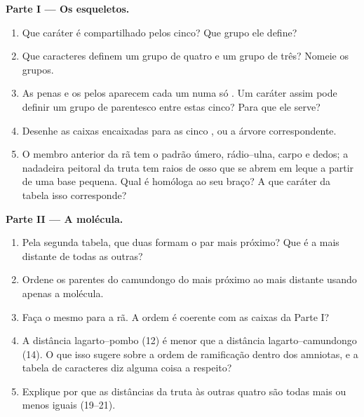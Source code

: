 \begin{problem}
\medskip
\noindent\textbf{Parte I --- Os esqueletos.}
\begin{enumerate}
  \item Que caráter é compartilhado pelos cinco? Que grupo ele define?
  \item Que caracteres definem um grupo de quatro e um grupo de três?
        Nomeie os grupos.
  \item As penas e os pelos aparecem cada um numa só . Um
        caráter assim pode definir um grupo de parentesco entre estas
        cinco? Para que ele serve?
  \item Desenhe as caixas encaixadas para as cinco , ou a
        árvore correspondente.
  \item O membro anterior da rã tem o padrão úmero, rádio--ulna, carpo
        e dedos; a nadadeira peitoral da truta tem raios de osso que se
        abrem em leque a partir de uma base pequena. Qual é homóloga ao
        seu braço? A que caráter da tabela isso corresponde?
\end{enumerate}

\medskip
\noindent\textbf{Parte II --- A molécula.}
\begin{enumerate}[resume]
  \item Pela segunda tabela, que duas  formam o par mais
        próximo? Que  é a mais distante de todas as outras?
  \item Ordene os parentes do camundongo do mais próximo ao mais
        distante usando apenas a molécula.
  \item Faça o mesmo para a rã. A ordem é coerente com as caixas da
        Parte I?
  \item A distância lagarto--pombo (12) é menor que a distância
        lagarto--camundongo (14). O que isso sugere sobre a ordem de
        ramificação dentro dos amniotas, e a tabela de caracteres diz
        alguma coisa a respeito?
  \item Explique por que as distâncias da truta às outras quatro são
        todas mais ou menos iguais (19--21).
\end{enumerate}


\end{problem}
